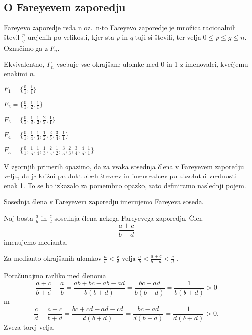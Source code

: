 \documentclass[mat1]{fmfdelo}
\begin{document}
\subsection{O Fareyevem zaporedju}

\begin{definicija}
Fareyevo zaporedje reda n oz.\ n-to Fareyevo zaporedje je množica racionalnih števil $\frac{p}{q}$ urejenih po velikosti, kjer sta $p$ in $q$ tuji si števili, ter velja $0 \leq p \leq g \leq n$. Označimo ga z $F_n$.

Ekvivalentno, $F_n$ vsebuje vse okrajšane ulomke med 0 in 1 z imenovalci, kvečjemu enakimi $n$.
\end{definicija}

\begin{primer}
\(F_1 = \{\frac{0}{1}, \frac{1}{1}\} \)

\(F_2 = \{\frac{0}{1}, \frac{1}{2}, \frac{1}{1}\} \)

\(F_3 = \{\frac{0}{1}, \frac{1}{3}, \frac{1}{2}, \frac{2}{3}, \frac{1}{1}\} \)

\(F_4 = \{\frac{0}{1}, \frac{1}{4}, \frac{1}{3}, \frac{1}{2}, \frac{2}{3}, \frac{3}{4}, \frac{1}{1}\} \)

\(F_5 = \{\frac{0}{1}, \frac{1}{5}, \frac{1}{4}, \frac{1}{3}, \frac{2}{5}, \frac{1}{2}, \frac{3}{5}, \frac{2}{3}, \frac{3}{4}, \frac{4}{5}, \frac{1}{1}\} \)
\end{primer}

V zgornjih primerih opazimo, da za vsaka sosednja člena v Fareyevem zaporedju velja, da je križni produkt obeh števcev in imenovalcev po absolutni vrednosti enak 1.  To se bo izkazalo za pomembno opazko, zato definiramo naslednji pojem.

\begin{definicija}
Sosednja člena v Fareyevem zaporedju imenujemo Fareyeva soseda.
\end{definicija}

\begin{definicija}
Naj bosta $\frac{a}{b}$ in $\frac{c}{d}$ sosednja člena nekega Fareyevega zaporedja. Člen \[\frac{a+c}{b+d} \] imenujemo medianta.
\end{definicija}

\begin{trditev}
Za medianto okrajšanih ulomkov \(\frac{a}{b} < \frac{c}{d}\) velja  \(\frac{a}{b} < \frac{a+c}{b+d} < \frac{c}{d}\) .
\end{trditev}

\begin{dokaz}
Poračunajmo razliko med členoma
\[\frac{a+c}{b+d} - \frac{a}{b} = \frac{ab+bc-ab-ad}{b(b+d)} = \frac{bc-ad}{b(b+d)} = \frac{1}{b(b+d)} > 0\] in
\[\frac{c}{d} - \frac{a+c}{b+d} = \frac{bc+cd-ad-cd}{d(b+d)} = \frac{bc-ad}{d(b+d)} = \frac{1}{d(b+d)} > 0.\]
Zveza torej velja. 
\end{dokaz}
\end{document}
